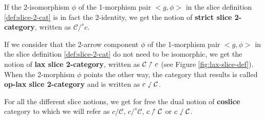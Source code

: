 \begin{defn}
    \label{def:strict-slice-2-cat}
    If the 2-isomorphism $\phi$ of the 1-morphism pair $\big<g,\phi\big>$ in the slice definition \ref{def:slice-2-cat} is in fact the 2-identity, we get the notion of \textbf{strict slice 2-category}, written as $\mathcal{C} /^s c$\label{nomencl:strict-slice}.
\end{defn}

\begin{defn}
    \label{def:lax-slice-2-cat}
    If we consider that the 2-arrow component $\phi$ of the 1-morphism pair $\big<g,\phi\big>$ in the slice definition \ref{def:slice-2-cat} do not need to be isomorphic, we get the notion of \textbf{lax slice 2-category}, written as $\mathcal{C}\nnearrow c$\label{nomencl:lax-slice}
    (see Figure \ref{fig:lax-slice-def}). When the 2-morphism $\phi$ points the other way, the category that results is called \textbf{op-lax slice 2-category} and is written as $c\sswarrow\mathcal{C}$\label{nomencl:oplax-slice}.
\end{defn}

\begin{rem}
    For all the different slice notions, we get for free the dual notion of \textbf{coslice} category to which we will refer as $c/\mathcal{C}$\label{nomencl:coslice}, $c/^s\mathcal{C}$\label{nomencl:strict-coslice}, $c\nnearrow\mathcal{C}$\label{nomencl:lax-coslice} or $c\sswarrow\mathcal{C}$\label{nomencl:oplax-coslice}.
\end{rem}


